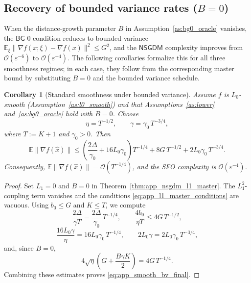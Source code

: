 \documentclass[letter,11pt]{article}
\newtheorem{corollary}{Corollary}[theorem]
\newcommand{\E}{\mathbb{E}}
\newcommand{\Ocal}{\mathcal{O}}
\begin{document}
\subsection{Recovery of bounded variance rates (\texorpdfstring{$B=0$}{B=0})}
\label{app:nsgdm_bv_recovery}

When the distance-growth parameter $B$ in Assumption~\ref{as:bg0_oracle}
vanishes, the $\mathsf{BG}$-0 condition reduces to bounded variance
$\E_\xi\|\nabla f(x;\xi)-\nabla f(x)\|^2\le G^2$, and the $\mathsf{NSGDM}$
complexity improves from $\Ocal(\varepsilon^{-6})$ to
$\Ocal(\varepsilon^{-4})$. The following corollaries formalize this for all
three smoothness regimes; in each case, they follow from the corresponding
master bound by substituting $B=0$ and the bounded variance schedule.

\begin{corollary}[Standard smoothness under bounded variance]
\label{cor:app_nsgdm_smooth_bv}
Assume $f$ is $L_0$-smooth (Assumption~\ref{as:l0_smooth}) and that
Assumptions~\ref{as:lower} and~\ref{as:bg0_oracle} hold with $B=0$.
Choose
\[
    \eta = T^{-1/2},
    \qquad
    \gamma = \gamma_0\,T^{-3/4},
\]
where $T:=K+1$ and $\gamma_0>0$. Then
\begin{equation}
\label{eq:app_smooth_bv_final}
    \E\|\nabla f(\widehat x)\|
    \le
    \left(
        \frac{2\Delta}{\gamma_0}
        + 16L_0\gamma_0
    \right) T^{-1/4}
    + 8G\,T^{-1/2}
    + 2L_0\gamma_0\,T^{-3/4}.
\end{equation}
Consequently,
$\E\|\nabla f(\widehat x)\| = \Ocal(T^{-1/4})$,
and the SFO complexity is $\Ocal(\varepsilon^{-4})$.
\end{corollary}

\begin{proof}
Set $L_1=0$ and $B=0$ in Theorem~\ref{thm:app_nsgdm_l1_master}. The
$L_1^2$-coupling term vanishes and the conditions
\eqref{eq:app_l1_master_conditions} are vacuous. Using $b_0\le G$ and
$K\le T$, we compute
\[
    \frac{2\Delta}{\gamma T}
    = \frac{2\Delta}{\gamma_0}\,T^{-1/4},
    \qquad
    \frac{4b_0}{\eta T}
    \le 4G\,T^{-1/2},
\]
\[
    \frac{16L_0\gamma}{\eta}
    = 16L_0\gamma_0\,T^{-1/4},
    \qquad
    2L_0\gamma
    = 2L_0\gamma_0\,T^{-3/4},
\]
and, since $B=0$,
\[
    4\sqrt{\eta}\left(G + \frac{B\gamma K}{2}\right)
    = 4G\,T^{-1/4}.
\]
Combining these estimates proves \eqref{eq:app_smooth_bv_final}.
\end{proof}
\end{document}
